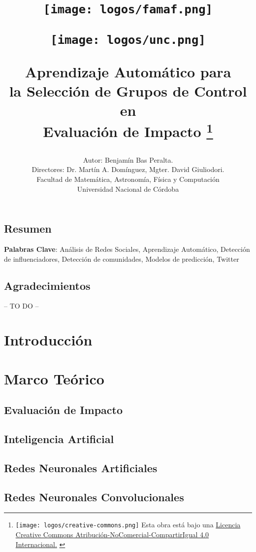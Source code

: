 \documentclass[a4paper,12pt,spanish]{book}
\title{
    \begin{minipage}{0.4\textwidth}
        \centering
        \texttt{[image: logos/famaf.png]}
    \end{minipage}
    \hfill
    \begin{minipage}{0.4\textwidth}
        \centering
        \texttt{[image: logos/unc.png]}
    \end{minipage}
    
    \textbf{
        Aprendizaje Automático para \\
        la Selección de Grupos de Control en \\
        Evaluación de Impacto
    } 
    \thanks{
        {
        {\protect\texttt{[image: logos/creative-commons.png]}} \fontsize{10}{11}\selectfont  Esta obra está bajo una \href{https://creativecommons.org/licenses/by-nc-sa/4.0/}{Licencia Creative Commons Atribución-NoComercial-CompartirIgual 4.0 Internacional.}
        }
    }
}
\author{
    Autor: Benjam\'in Bas Peralta.\\
    Directores: Dr. Martín A. Domínguez, Mgter. David Giuliodori.\\ 
    Facultad de Matemática, Astronomía, Física y Computación\\
    Universidad Nacional de Córdoba
}
\begin{document}
\maketitle
\cleardoublepage

\section*{Resumen}

\bigskip
\textbf{Palabras Clave}: Análisis de Redes Sociales, Aprendizaje Automático, Detección de influenciadores, Detección de comunidades, Modelos de predicción, Twitter
\clearpage

\thispagestyle{empty}
\section*{Agradecimientos}
-- TO DO --
\clearpage

\tableofcontents
\clearpage

\chapter{Introducción}


\chapter{Marco Teórico}

\section{Evaluación de Impacto}


\section{Inteligencia Artificial}


\section{Redes Neuronales Artificiales}



\section{Redes Neuronales Convolucionales}

\end{document}
